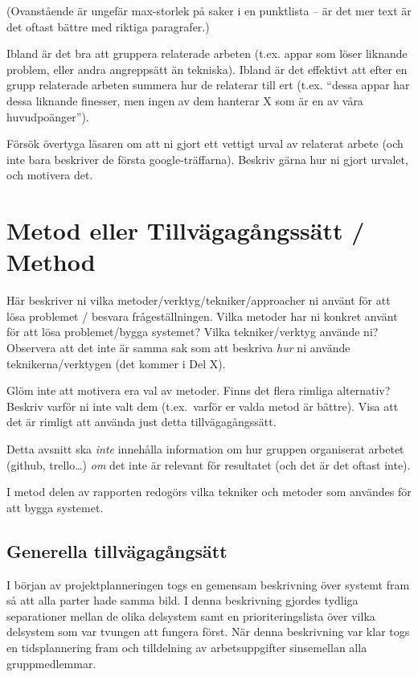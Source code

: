 \documentclass[a4paper,12pt]{article}
\begin{document}
(Ovanstående är ungefär max-storlek på saker i en punktlista -- är det mer text är det oftast bättre med riktiga paragrafer.)

Ibland är det bra att gruppera relaterade arbeten (t.ex. appar som löser liknande problem, eller andra angreppsätt än tekniska).
Ibland är det effektivt att efter en grupp relaterade arbeten summera hur de relaterar till ert (t.ex. ``dessa appar har dessa liknande finesser, men ingen av dem hanterar X som är en av våra huvudpoänger'').

Försök övertyga läsaren om att ni gjort ett vettigt urval av relaterat arbete (och inte bara beskriver de första google-träffarna). Beskriv gärna hur ni gjort urvalet, och motivera det.

\section{Metod eller Tillvägagångssätt / Method}
Här beskriver ni vilka metoder/verktyg/tekniker/approacher ni använt för att lösa problemet / besvara frågeställningen.  Vilka metoder har ni konkret använt för att lösa problemet/bygga systemet?  Vilka tekniker/verktyg använde ni? Observera att det inte är samma sak som att beskriva \emph{hur} ni använde teknikerna/verktygen (det kommer i Del X).


Glöm inte att motivera era val av metoder. Finns det flera rimliga alternativ? Beskriv varför ni inte valt dem (t.ex.~varför er valda metod är bättre).
Visa att det är rimligt att använda just detta tillvägagångssätt.

Detta avsnitt
ska \emph{inte} innehålla information om hur gruppen organiserat arbetet (github, trello\ldots) \emph{om} det inte är relevant för resultatet (och det är det oftast inte).

I metod delen av rapporten redogörs vilka tekniker och metoder som användes för att bygga systemet.

\subsection{Generella tillvägagångsätt}
I början av projektplanneringen togs en gemensam beskrivning över systemt fram så att alla parter hade samma bild. I denna beskrivning gjordes tydliga separationer mellan de olika delsystem samt en prioriteringslista över vilka delsystem som var tvungen att fungera först. När denna beskrivning var klar togs en tidsplannering fram och tilldelning av arbetsuppgifter sinsemellan alla gruppmedlemmar.
\end{document}
